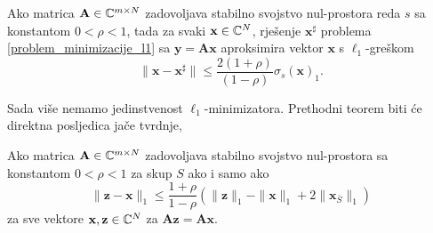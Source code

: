 \documentclass[a4paper,twoside,12pt]{memoir} %
\newcommand{\vect}[1]{\mathbf{#1}}
\renewcommand{\vec}{\vect}
\newcommand{\norm}[1]{\|{#1}\|}
\begin{document}
\begin{thm}\label{stabilnost_tm_1}
    Ako matrica $\vec A \in \C^{m \times N}$ zadovoljava stabilno svojstvo nul-prostora reda $s$ sa konstantom $0<\rho<1$, tada za svaki $\vec x \in \C^N$, rje\v{s}enje $\vec x^{\sharp}$ problema \eqref{problem_minimizacije_l1} sa $\vec y = \vec{Ax}$ aproksimira vektor $\vec x$ s $\ell_1$-gre\v{s}kom
    \begin{equation}\label{stabilnost_tm_1_nejed}
        \norm{\vec x - \vec x ^{\sharp}} \leq \frac{2(1+\rho)}{(1-\rho)}\sigma_s(\vec x)_1.
    \end{equation}
\end{thm}
\noindent
Sada vi\v{s}e nemamo jedinstvenost $\ell_1$-minimizatora. Prethodni teorem biti \'ce direktna posljedica ja\v{c}e tvrdnje,
\begin{thm}\label{stabilnost_tm_2}
    Ako matrica $\vec A \in \C^{m \times N}$ zadovoljava stabilno svojstvo nul-prostora sa konstantom $0<\rho<1$ za skup $S$ ako i samo ako
    \begin{equation}\label{stabilnost_tm_2_nejed}
        \norm{\vec z - \vec x}_1  \leq \frac{1+\rho}{1-\rho}(\norm{\vec z}_1 - \norm{\vec x}_1 + 2 \norm{\vec x_{\bar S}}_1) 
    \end{equation}
    za sve vektore $\vec x, \vec z \in \C^N$ za $\vec{Az} = \vec{Ax}$.
\end{thm}
\end{document}
